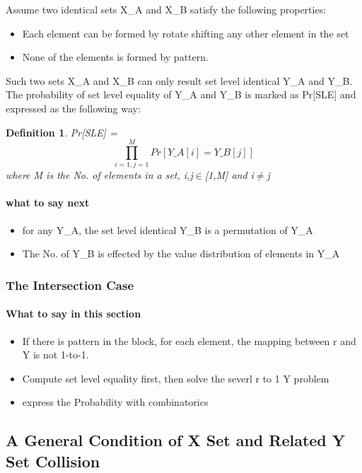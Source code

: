 \documentclass{article}
\newtheorem{defination}{Definition}[section]
\begin{document}
Assume two identical sets X\_A and X\_B satisfy the following properties:
\begin{itemize}
	\item Each element can be formed by rotate shifting any other element in the set
	\item None of the elements is formed by pattern.
\end{itemize}
Such two sets X\_A and X\_B can only result set level identical Y\_A and Y\_B.
The probability of set level equality of Y\_A and Y\_B is marked as Pr[SLE] and expressed as the following way:
\begin{defination}
Pr[SLE] = $$\prod_{i=1,j=1}^M Pr[Y\_A[i] = Y\_B[j]]$$ where M is the No. of elements in a set, i,j$\in$[1,M] and i$\neq$j
\end{defination} 

\paragraph{what to say next}
\begin{itemize}
	\item for any Y\_A, the set level identical Y\_B is a permutation of Y\_A
	\item The No. of Y\_B is effected by the value distribution of elements in Y\_A
\end{itemize}



\subsubsection{The Intersection Case}
\paragraph{What to say in this section}
\begin{itemize}
	\item If there is pattern in the block, for each element, the mapping between r and Y is not 1-to-1.
	\item Compute set level equality first, then solve the severl r to 1 Y problem
	\item express the Probability with combinatorics
\end{itemize}

\subsection{A General Condition of X Set and Related Y Set Collision}
\end{document}
